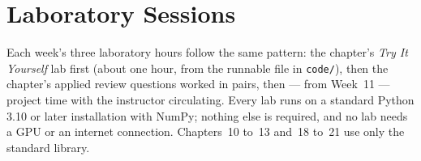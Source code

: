 \section{Laboratory Sessions}

Each week's three laboratory hours follow the same pattern: the chapter's
\emph{Try It Yourself} lab first (about one hour, from the runnable file in
\texttt{code/}), then the chapter's applied review questions worked in pairs, then ---
from Week~11 --- project time with the instructor circulating. Every lab runs on a
standard Python 3.10 or later installation with NumPy; nothing else is required, and
no lab needs a GPU or an internet connection. Chapters~10 to~13 and~18 to~21 use only
the standard library.
